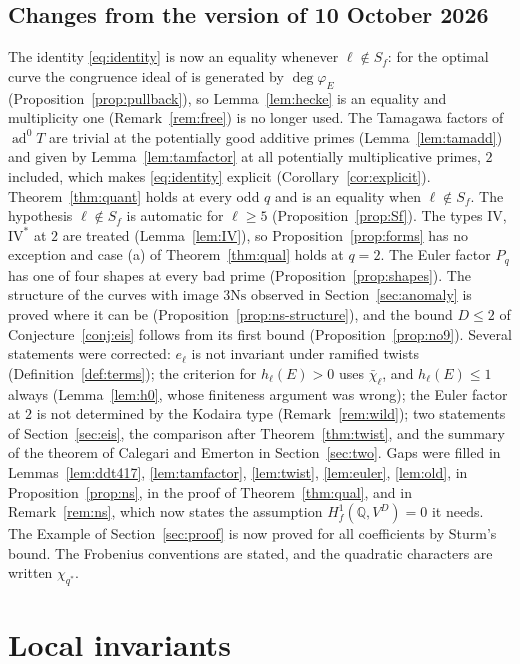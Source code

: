 \documentclass[11pt]{amsart}
\theoremstyle{definition}
\newcommand{\Q}{\mathbb{Q}}
\newcommand{\degphi}{\deg\varphi_E}
\newcommand{\ad}{\operatorname{ad}^0}
\newcommand{\Ns}{3\mathrm{Ns}}
\begin{document}
\subsection{Changes from the version of 10 October 2026}
The identity \eqref{eq:identity} is now an equality whenever $\ell\notin S_f$: for the optimal curve the congruence ideal of \cite{DFG04} is generated by $\degphi$ (Proposition~\ref{prop:pullback}), so Lemma~\ref{lem:hecke} is an equality and multiplicity one (Remark~\ref{rem:free}) is no longer used. The Tamagawa factors of $\ad T$ are trivial at the potentially good additive primes (Lemma~\ref{lem:tamadd}) and given by Lemma~\ref{lem:tamfactor} at all potentially multiplicative primes, $2$ included, which makes \eqref{eq:identity} explicit (Corollary~\ref{cor:explicit}). Theorem~\ref{thm:quant} holds at every odd $q$ and is an equality when $\ell\notin S_f$. The hypothesis $\ell\notin S_f$ is automatic for $\ell\ge5$ (Proposition~\ref{prop:Sf}). The types $\mathrm{IV}$, $\mathrm{IV}^*$ at $2$ are treated (Lemma~\ref{lem:IV}), so Proposition~\ref{prop:forms} has no exception and case (a) of Theorem~\ref{thm:qual} holds at $q=2$. The Euler factor $P_q$ has one of four shapes at every bad prime (Proposition~\ref{prop:shapes}). The structure of the curves with image $\Ns$ observed in Section~\ref{sec:anomaly} is proved where it can be (Proposition~\ref{prop:ns-structure}), and the bound $D\le2$ of Conjecture~\ref{conj:eis} follows from its first bound (Proposition~\ref{prop:no9}). Several statements were corrected: $e_\ell$ is not invariant under ramified twists (Definition~\ref{def:terms}); the criterion for $h_\ell(E)>0$ uses $\bar\chi_\ell$, and $h_\ell(E)\le1$ always (Lemma~\ref{lem:h0}, whose finiteness argument was wrong); the Euler factor at $2$ is not determined by the Kodaira type (Remark~\ref{rem:wild}); two statements of Section~\ref{sec:eis}, the comparison after Theorem~\ref{thm:twist}, and the summary of the theorem of Calegari and Emerton in Section~\ref{sec:two}. Gaps were filled in Lemmas~\ref{lem:ddt417}, \ref{lem:tamfactor}, \ref{lem:twist}, \ref{lem:euler}, \ref{lem:old}, in Proposition~\ref{prop:ns}, in the proof of Theorem~\ref{thm:qual}, and in Remark~\ref{rem:ns}, which now states the assumption $H^1_f(\Q,V^D)=0$ it needs. The Example of Section~\ref{sec:proof} is now proved for all coefficients by Sturm's bound. The Frobenius conventions are stated, and the quadratic characters are written $\chi_{q^*}$.

\section{Local invariants}\label{sec:local}
\end{document}
